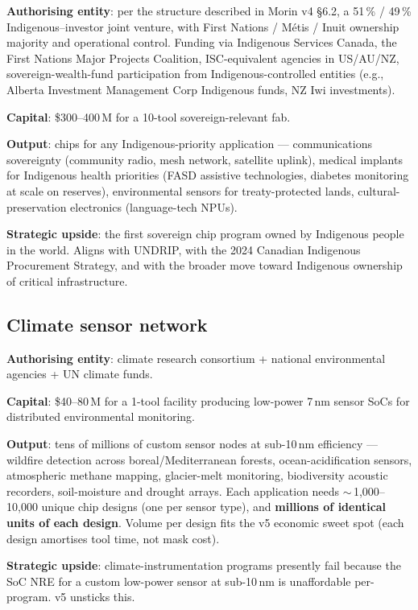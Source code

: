 \documentclass[11pt,letterpaper]{article}
\begin{document}
\textbf{Authorising entity}: per the structure described in Morin v4 \S 6.2, a 51\,\% / 49\,\% Indigenous--investor joint venture, with First Nations / M\'etis / Inuit ownership majority and operational control. Funding via Indigenous Services Canada, the First Nations Major Projects Coalition, ISC-equivalent agencies in US/AU/NZ, sovereign-wealth-fund participation from Indigenous-controlled entities (e.g., Alberta Investment Management Corp Indigenous funds, NZ Iwi investments).

\textbf{Capital}: \$300--400\,M for a 10-tool sovereign-relevant fab.

\textbf{Output}: chips for any Indigenous-priority application --- communications sovereignty (community radio, mesh network, satellite uplink), medical implants for Indigenous health priorities (FASD assistive technologies, diabetes monitoring at scale on reserves), environmental sensors for treaty-protected lands, cultural-preservation electronics (language-tech NPUs).

\textbf{Strategic upside}: the first sovereign chip program owned by Indigenous people in the world. Aligns with UNDRIP, with the 2024 Canadian Indigenous Procurement Strategy, and with the broader move toward Indigenous ownership of critical infrastructure.

\subsection{Climate sensor network}

\textbf{Authorising entity}: climate research consortium + national environmental agencies + UN climate funds.

\textbf{Capital}: \$40--80\,M for a 1-tool facility producing low-power 7\,nm sensor SoCs for distributed environmental monitoring.

\textbf{Output}: tens of millions of custom sensor nodes at sub-10\,nm efficiency --- wildfire detection across boreal/Mediterranean forests, ocean-acidification sensors, atmospheric methane mapping, glacier-melt monitoring, biodiversity acoustic recorders, soil-moisture and drought arrays. Each application needs $\sim$\,1{,}000--10{,}000 unique chip designs (one per sensor type), and \textbf{millions of identical units of each design}. Volume per design fits the v5 economic sweet spot (each design amortises tool time, not mask cost).

\textbf{Strategic upside}: climate-instrumentation programs presently fail because the SoC NRE for a custom low-power sensor at sub-10\,nm is unaffordable per-program. v5 unsticks this.
\end{document}
